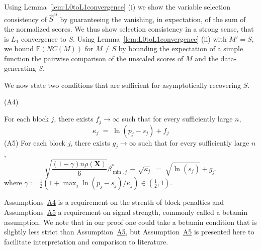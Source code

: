 \documentclass[
  12pt]{article}
\newcommand{\E}{\mathbb{E}}
\newcommand{\I}{\mathbb{I}}
\newcommand{\bX}{\mathbf{X}}
\begin{document}
Using Lemma~\ref{lem:L0toL1convergence} (i) we show the variable selection consistency of $\hat S^{ei}$ by guaranteeing the vanishing, in expectation, of the sum of the normalized scores. We thus show selection consistency in a strong sense, that is $L_1$ convergence to $S$. Using Lemma~\ref{lem:L0toL1convergence} (ii) with $M'=S$, we bound $\E(NC(M))$ for $M\neq S$ by bounding the expectation of a simple function the pairwise comparison of the unscaled scores of $M$ and the data-generating $S$.

We now state two conditions that are sufficient for asymptotically recovering $S$.

\hypertarget{lab:A4}{(A4)} \quad For each block $j$, there exists $f_j\to \infty$ such that for every sufficiently large $n$,
\begin{equation*}
    \kappa_j \;=\;\ln(p_j-s_j) + f_j
\end{equation*} 
\hypertarget{lab:A5}{(A5)} \quad For each block $j$, there exists $g_j\to \infty$ such that for every sufficiently large $n$,
    \begin{equation*}
        \sqrt{\frac{(1-\gamma) n\rho(\bX)}{6}}{\beta_{\min,j}^*} \,- \,\sqrt{\kappa_j} \;=\; \sqrt{\ln(s_j)} + g_j.
    \end{equation*}
where $\gamma:=\tfrac12(1+\max_j\ln(p_j-s_j)/\kappa_j)\in (\tfrac12,1)$.

Assumptions~\hyperlink{lab:A4}{A4} is a requirement on the strenth of block penalties and Assumptions~\hyperlink{lab:A5}{A5} a requirement on signal strength, commonly called a betamin assumption. We note that in our proof one could take a betamin condition that is slightly less strict than Assumption~\hyperlink{lab:A5}{A5}, but Assumption~\hyperlink{lab:A5}{A5} is presented here to facilitate interpretation and comparison to literature.

\end{document}

